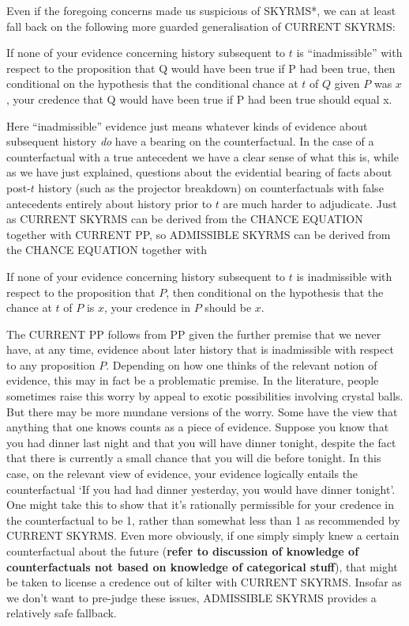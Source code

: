 \documentclass[leqno, 11pt, a5paper, openany]{article}
\begin{document}
Even if the foregoing concerns made us suspicious of SKYRMS*, we can at least fall back on the following more guarded generalisation of CURRENT SKYRMS:
\begin{prop}
	 \label{admissible_skyrms}
	If none of your evidence concerning history subsequent to $t$ is “inadmissible” with respect to the proposition that Q would have been true if P had been true, then conditional on the hypothesis that the conditional chance at $t$ of $Q$ given $P$ was $x$, your credence that Q would have been true if P had been true should equal x.
\end{prop}
Here “inadmissible” evidence just means whatever kinds of evidence about subsequent history \emph{do} have a bearing on the counterfactual. In the case of a counterfactual with a true antecedent we have a clear sense of what this is, while as we have just explained, questions about the evidential bearing of facts about post-$t$ history (such as the projector breakdown) on counterfactuals with false antecedents entirely about history prior to $t$ are much harder to adjudicate. Just as CURRENT SKYRMS can be derived from the CHANCE EQUATION together with CURRENT PP, so ADMISSIBLE SKYRMS can be derived from the CHANCE EQUATION together with
\begin{prop}
	 \label{pp}
	If none of your evidence concerning history subsequent to $t$ is inadmissible with respect to the proposition that $P$, then conditional on the hypothesis that the chance at $t$ of $P$ is $x$, your credence in $P$ should be $x$. 
\end{prop}

The CURRENT PP follows from PP given the further premise that we never have, at any time, evidence about later history that is inadmissible with respect to any proposition $P$. Depending on how one thinks of the relevant notion of evidence, this may in fact be a problematic premise. In the literature, people sometimes raise this worry by appeal to exotic possibilities involving crystal balls. But there may be more mundane versions of the worry. Some have the view that anything that one knows counts as a piece of evidence. Suppose you know that you had dinner last night and that you will have dinner tonight, despite the fact that there is currently a small chance that you will die before tonight. In this case, on the relevant view of evidence, your evidence logically entails the counterfactual ‘If you had had dinner yesterday, you would have dinner tonight’. One might take this to show that it's rationally permissible for your credence in the counterfactual to be 1, rather than somewhat less than 1 as recommended by CURRENT SKYRMS. Even more obviously, if one simply simply knew a certain counterfactual about the future (\textbf{refer to discussion of knowledge of counterfactuals not based on knowledge of categorical stuff}), that might be taken to license a credence out of kilter with CURRENT SKYRMS. Insofar as we don't want to pre-judge these issues, ADMISSIBLE SKYRMS provides a relatively safe fallback.
\end{document}
